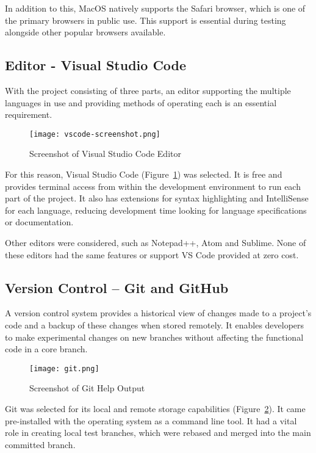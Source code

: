 In addition to this, MacOS natively supports the Safari browser, which is one of the primary browsers in public use. This support is essential during testing alongside other popular browsers available.


\subsection{Editor - Visual Studio Code}
With the project consisting of three parts, an editor supporting the multiple languages in use and providing methods of operating each is an essential requirement. 

\begin{figure}[ht!]
    \centerline{\texttt{[image: vscode-screenshot.png]}}
    \caption{Screenshot of Visual Studio Code Editor}
    \label{fig:vscode}
\end{figure}

For this reason, Visual Studio Code (Figure~\ref{fig:vscode}) was selected. It is free and provides terminal access from within the development environment to run each part of the project. It also has extensions for syntax highlighting and IntelliSense for each language, reducing development time looking for language specifications or documentation.

Other editors were considered, such as Notepad++, Atom and Sublime. None of these editors had the same features or support VS Code provided at zero cost.


\subsection{Version Control -- Git and GitHub}
A version control system \parencite{zolkifli_version_2018} provides a historical view of changes made to a project's code and a backup of these changes when stored remotely. It enables developers to make experimental changes on new branches without affecting the functional code in a core branch.

\begin{figure}[ht!]
    \centerline{\texttt{[image: git.png]}}
    \caption{Screenshot of Git Help Output}
    \label{fig:git}
\end{figure}

Git \parencite{chacon_pro_2014} was selected for its local and remote storage capabilities (Figure~\ref{fig:git}). It came pre-installed with the operating system as a command line tool. It had a vital role in creating local test branches, which were rebased and merged into the main committed branch.

